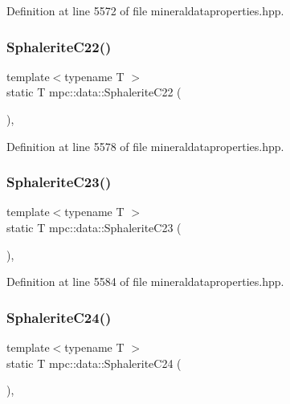 Definition at line 5572 of file mineraldataproperties.\+hpp.

\mbox{\label{namespacempc_1_1data_a2880bf365a0c13047e09f6f11c550ba9}} 
\subsubsection{\texorpdfstring{Sphalerite\+C22()}{SphaleriteC22()}}
{\footnotesize\ttfamily template$<$typename T $>$ \\
static T mpc\+::data\+::\+Sphalerite\+C22 (\begin{DoxyParamCaption}{ }\end{DoxyParamCaption})\hspace{0.3cm}{\ttfamily [inline]}, {\ttfamily [static]}}



Definition at line 5578 of file mineraldataproperties.\+hpp.

\mbox{\label{namespacempc_1_1data_aa705441ae21d0992816fc5c43783f5ad}} 
\subsubsection{\texorpdfstring{Sphalerite\+C23()}{SphaleriteC23()}}
{\footnotesize\ttfamily template$<$typename T $>$ \\
static T mpc\+::data\+::\+Sphalerite\+C23 (\begin{DoxyParamCaption}{ }\end{DoxyParamCaption})\hspace{0.3cm}{\ttfamily [inline]}, {\ttfamily [static]}}



Definition at line 5584 of file mineraldataproperties.\+hpp.

\mbox{\label{namespacempc_1_1data_a77a54876b1fce10bf027a5d9bf8b0a54}} 
\subsubsection{\texorpdfstring{Sphalerite\+C24()}{SphaleriteC24()}}
{\footnotesize\ttfamily template$<$typename T $>$ \\
static T mpc\+::data\+::\+Sphalerite\+C24 (\begin{DoxyParamCaption}{ }\end{DoxyParamCaption})\hspace{0.3cm}{\ttfamily [inline]}, {\ttfamily [static]}}



